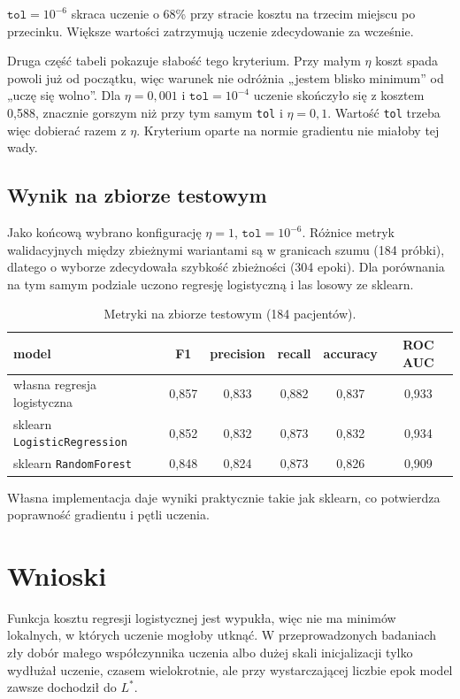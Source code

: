\documentclass[11pt,a4paper]{article}
\begin{document}
$\texttt{tol} = 10^{-6}$ skraca uczenie o 68\% przy stracie kosztu na trzecim miejscu po
przecinku. Większe wartości zatrzymują uczenie zdecydowanie za wcześnie.

Druga część tabeli pokazuje słabość tego kryterium. Przy małym $\eta$ koszt spada powoli już od
początku, więc warunek nie odróżnia „jestem blisko minimum'' od „uczę się wolno''. Dla
$\eta = 0{,}001$ i $\texttt{tol} = 10^{-4}$ uczenie skończyło się z kosztem 0,588, znacznie
gorszym niż przy tym samym \texttt{tol} i $\eta = 0{,}1$. Wartość \texttt{tol} trzeba więc dobierać
razem z $\eta$. Kryterium oparte na normie gradientu nie miałoby tej wady.

\subsection{Wynik na zbiorze testowym}

Jako końcową wybrano konfigurację $\eta = 1$, $\texttt{tol} = 10^{-6}$. Różnice metryk
walidacyjnych między zbieżnymi wariantami są w granicach szumu (184 próbki), dlatego
o wyborze zdecydowała szybkość zbieżności (304 epoki). Dla porównania na tym samym podziale
uczono regresję logistyczną i las losowy ze sklearn.

\begin{table}[H]
\centering
\begin{tabular}{lccccc}
\toprule
model & F1 & precision & recall & accuracy & ROC AUC \\
\midrule
własna regresja logistyczna      & 0,857 & 0,833 & 0,882 & 0,837 & 0,933 \\
sklearn \texttt{LogisticRegression} & 0,852 & 0,832 & 0,873 & 0,832 & 0,934 \\
sklearn \texttt{RandomForest}    & 0,848 & 0,824 & 0,873 & 0,826 & 0,909 \\
\bottomrule
\end{tabular}
\caption{Metryki na zbiorze testowym (184 pacjentów).}
\end{table}

Własna implementacja daje wyniki praktycznie takie jak sklearn, co potwierdza poprawność
gradientu i pętli uczenia.

\section{Wnioski}

Funkcja kosztu regresji logistycznej jest wypukła, więc nie ma minimów lokalnych, w których
uczenie mogłoby utknąć. W przeprowadzonych badaniach zły dobór małego współczynnika uczenia
albo dużej skali inicjalizacji tylko wydłużał uczenie, czasem wielokrotnie, ale przy
wystarczającej liczbie epok model zawsze dochodził do $L^\ast$.
\end{document}
